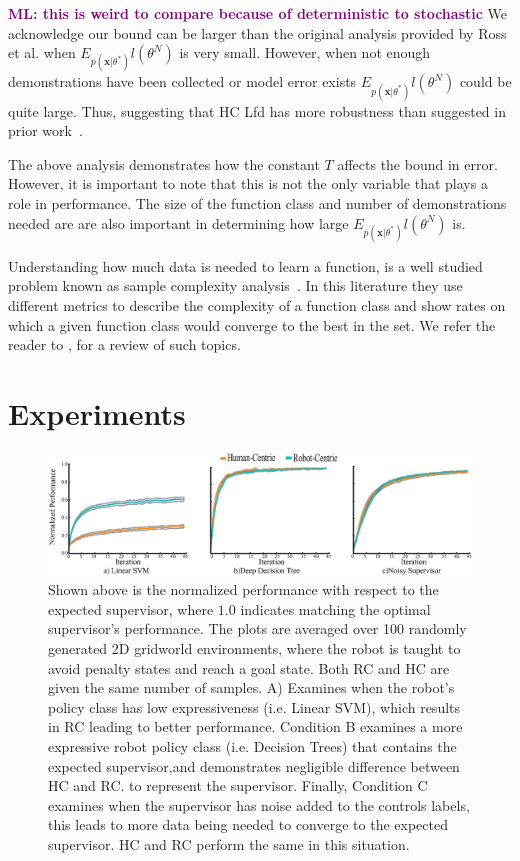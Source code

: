 \documentclass[10pt, conference]{ieeeconf}      %
\newcommand{\bx}{\mathbf{x}}
\newcommand{\mlnote}[1]{\ifthenelse{ \boolean{include-notes}}%
 {\textcolor{purple}{\textbf{ML: #1}}}{}}
\begin{document}
  
 \mlnote{this is weird to compare because of deterministic to stochastic}
We acknowledge our bound can be larger than the original analysis provided by Ross et al. when  $E_{p(\bx|\theta^*)} l(\theta^N)$ is very small. However, when not enough demonstrations have been collected or model error exists $E_{p(\bx|\theta^*)} l(\theta^N)$ could be quite large. Thus, suggesting that HC Lfd has more robustness than suggested in prior work~\cite{ross2010reduction}. 

The above analysis demonstrates how the constant $T$ affects the bound in error. However, it is important to note that this is not the only variable that plays a role in performance. The size of the function class and number of demonstrations needed are are also important in determining how large $E_{p(\bx|\theta^*)} l(\theta^N)$ is. 

Understanding how much data is needed to learn a function, is a well studied problem known as sample complexity analysis~\cite{anthony2009neural,bartlett2002rademacher,kakade2009complexity}. In this literature they use different metrics to describe the complexity of a function class and show rates on which a given function class would converge to the best in the set. We refer the reader to \cite{vapnik2013nature}, for a review of such topics. 

\section{Experiments}

\begin{figure}
\includegraphics{f_figs/var_grid.eps}
\caption{
    \footnotesize
Shown above is the normalized performance with respect to the expected supervisor, where $1.0$ indicates matching the optimal supervisor's performance. The plots are averaged over 100 randomly generated 2D gridworld environments,  where the robot is taught to avoid penalty states and reach a goal state. Both RC and HC are given the same number of samples. A) Examines when the robot's policy class has low expressiveness (i.e. Linear SVM), which results in RC  leading to better performance. Condition B examines a more expressive robot policy class (i.e. Decision Trees) that contains the expected supervisor,and demonstrates negligible difference between HC and RC.  to represent the supervisor.  Finally, Condition C examines when the supervisor has noise added to the controls labels, this leads to more data being needed to converge to the expected supervisor. HC and RC perform the same in this situation.  }
\vspace*{-20pt}
\label{fig:var}
\end{figure}
\end{document}
